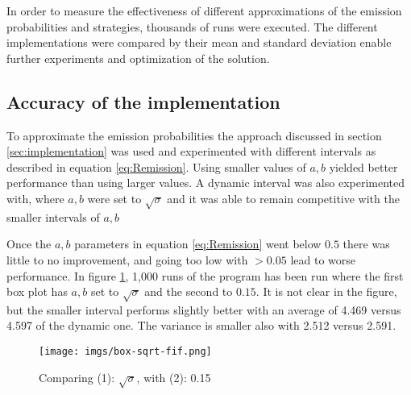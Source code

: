 \documentclass[12pt, a4paper]{article}
\begin{document}
In order to measure the effectiveness of different approximations of the emission probabilities and strategies, thousands of runs were executed. The different implementations were compared by their mean and standard deviation enable further experiments and optimization of the solution. 

\subsection{Accuracy of the implementation}
To approximate the emission probabilities the approach discussed in section \ref{sec:implementation} was used and experimented with different intervals as described in equation \ref{eq:Remission}. Using smaller values of $a,b$ yielded better performance than using larger values. A dynamic interval was also experimented with, where $a,b$ were set to $\sqrt{\sigma}$ and it was able to remain competitive with the smaller intervals of $a,b$

Once the $a,b$ parameters in equation \ref{eq:Remission} went below $0.5$ there was little to no improvement, and going too low with $>0.05$ lead to worse performance. In figure \ref{fig:box-sqrt-fif.png}, 1,000 runs of the program has been run where the first box plot has $a,b$ set to $\sqrt{\sigma}$ and the second to $0.15$. It is not clear in the figure, but the smaller interval performs slightly better with an average of 4.469 versus 4.597 of the dynamic one. The variance is smaller also with 2.512 versus 2.591.%

\begin{figure}[!ht]\label{fig:box-sqrt-fif.png}
\centering
\texttt{[image: imgs/box-sqrt-fif.png]}\\
\caption{Comparing (1): $\sqrt{\sigma}$, with (2): 0.15}
\end{figure}
\end{document}
